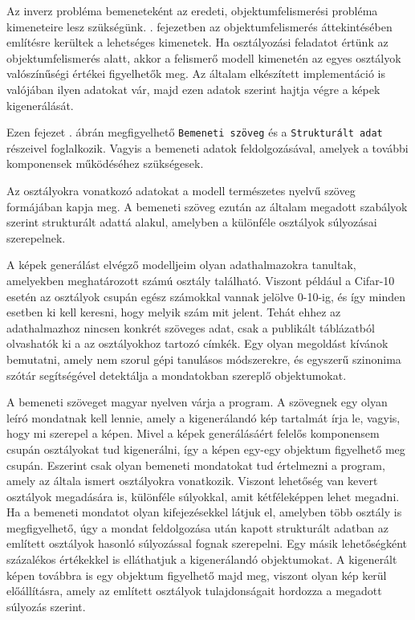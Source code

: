 
Az inverz probléma bemeneteként az eredeti, objektumfelismerési probléma kimeneteire lesz szükségünk. . fejezetben az objektumfelismerés áttekintésében említésre kerültek a lehetséges kimenetek. Ha osztályozási feladatot értünk az objektumfelismerés alatt, akkor a felismerő modell kimenetén az egyes osztályok valószínűségi értékei figyelhetők meg. Az általam elkészített implementáció is valójában ilyen adatokat vár, majd ezen adatok szerint hajtja végre a képek kigenerálását.

Ezen fejezet  . ábrán megfigyelhető \texttt{Bemeneti szöveg} és a \texttt{Strukturált adat} részeivel foglalkozik. Vagyis a bemeneti adatok feldolgozásával, amelyek a további komponensek működéséhez szükségesek.

Az osztályokra vonatkozó adatokat a modell természetes nyelvű szöveg formájában kapja meg. A bemeneti szöveg ezután az általam megadott szabályok szerint strukturált adattá alakul, amelyben a különféle osztályok súlyozásai szerepelnek.

A képek generálást elvégző modelljeim olyan adathalmazokra tanultak, amelyekben meghatározott számú osztály található. Viszont például a Cifar-10 esetén az osztályok csupán egész számokkal vannak jelölve 0-10-ig, és így minden esetben ki kell keresni, hogy melyik szám mit jelent. Tehát ehhez az adathalmazhoz nincsen konkrét szöveges adat, csak a publikált táblázatból olvashatók ki a az osztályokhoz tartozó címkék. Egy olyan megoldást kívánok bemutatni, amely nem szorul gépi tanulásos módszerekre, és egyszerű szinonima szótár segítségével detektálja a mondatokban szereplő objektumokat.


A bemeneti szöveget magyar nyelven várja a program. A szövegnek egy olyan leíró mondatnak kell lennie, amely a kigenerálandó kép tartalmát írja le, vagyis, hogy mi szerepel a képen. Mivel a képek generálásáért felelős komponensem csupán osztályokat tud kigenerálni, így a képen egy-egy objektum figyelhető meg csupán. Eszerint csak olyan bemeneti mondatokat tud értelmezni a program, amely az általa ismert osztályokra vonatkozik. Viszont lehetőség van kevert osztályok megadására is, különféle súlyokkal, amit kétféleképpen lehet megadni. Ha a bemeneti mondatot olyan kifejezésekkel látjuk el, amelyben több osztály is megfigyelhető, úgy a mondat feldolgozása után kapott strukturált adatban az említett osztályok hasonló súlyozással fognak szerepelni. Egy másik lehetőségként százalékos értékekkel is elláthatjuk a kigenerálandó objektumokat. A kigenerált képen továbbra is egy objektum figyelhető majd meg, viszont olyan kép kerül előállításra, amely az említett osztályok tulajdonságait hordozza a megadott súlyozás szerint.

